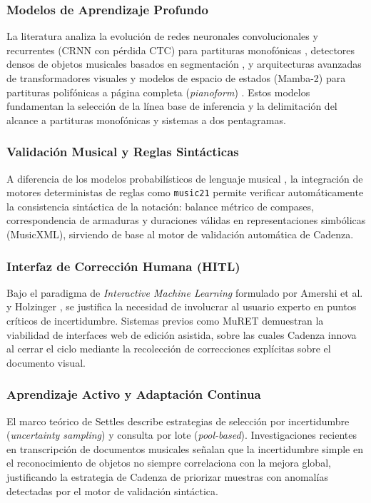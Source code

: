 \subsubsection{Modelos de Aprendizaje Profundo}
La literatura analiza la evoluci\'on de redes neuronales convolucionales y recurrentes (CRNN con p\'erdida CTC) para partituras monof\'onicas \cite{calvo2018}, detectores densos de objetos musicales basados en segmentaci\'on \cite{tuggener2020}, y arquitecturas avanzadas de transformadores visuales y modelos de espacio de estados (Mamba-2) para partituras polif\'onicas a p\'agina completa (\emph{pianoform}) \cite{riosvila2026}. Estos modelos fundamentan la selecci\'on de la l\'inea base de inferencia y la delimitaci\'on del alcance a partituras monof\'onicas y sistemas a dos pentagramas.

\subsubsection{Validaci\'on Musical y Reglas Sint\'acticas}
A diferencia de los modelos probabil\'isticos de lenguaje musical \cite{omr2020}, la integraci\'on de motores deterministas de reglas como \texttt{music21} \cite{cuthbert2010} permite verificar autom\'aticamente la consistencia sint\'actica de la notaci\'on: balance m\'etrico de compases, correspondencia de armaduras y duraciones v\'alidas en representaciones simb\'olicas (MusicXML), sirviendo de base al motor de validaci\'on autom\'atica de Cadenza.

\subsubsection{Interfaz de Correcci\'on Humana (HITL)}
Bajo el paradigma de \emph{Interactive Machine Learning} formulado por Amershi et al. \cite{amershi2014} y Holzinger \cite{holzinger2016}, se justifica la necesidad de involucrar al usuario experto en puntos cr\'iticos de incertidumbre. Sistemas previos como MuRET \cite{rizo2023} demuestran la viabilidad de interfaces web de edici\'on asistida, sobre las cuales Cadenza innova al cerrar el ciclo mediante la recolecci\'on de correcciones expl\'icitas sobre el documento visual.

\subsubsection{Aprendizaje Activo y Adaptaci\'on Continua}
El marco te\'orico de Settles \cite{settles2009} describe estrategias de selecci\'on por incertidumbre (\emph{uncertainty sampling}) y consulta por lote (\emph{pool-based}). Investigaciones recientes en transcripci\'on de documentos musicales \cite{mlsp2025} se\~nalan que la incertidumbre simple en el reconocimiento de objetos no siempre correlaciona con la mejora global, justificando la estrategia de Cadenza de priorizar muestras con anomal\'ias detectadas por el motor de validaci\'on sint\'actica.

